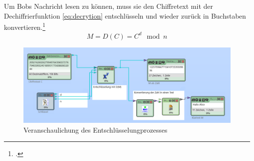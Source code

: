 \documentclass{scrarticle}
\begin{document}
            Um Bobs Nachricht lesen zu können, muss sie den Chiffretext mit der Dechiffrierfunktion \ref{eq:decrytion} entschlüsseln und wieder zurück in Buchstaben konvertieren.\footcite[77]{ertel2003}
            \begin{equation}
                M = D(C) = C^{d}\mod{n} \label{eq:decrytion}
            \end{equation}
            \begin{figure}
                \includegraphics[width=\linewidth]{content/cryptool_decrypt_e1.png}
                \caption{Veranschaulichung des Entschlüsselungprozesses\protect\footnotemark}
                \label{fig:decrypt}
            \end{figure}

\end{document}
